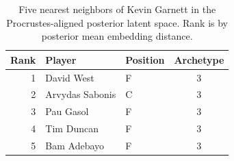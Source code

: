 \begin{table}[htbp]
  \centering\small
  \begin{tabular}{rllc}
    \toprule
    Rank & Player & Position & Archetype \\
    \midrule
    1 & David West & F & 3 \\
    2 & Arvydas Sabonis & C & 3 \\
    3 & Pau Gasol & F & 3 \\
    4 & Tim Duncan & F & 3 \\
    5 & Bam Adebayo & F & 3 \\
    \bottomrule
  \end{tabular}
  \caption{Five nearest neighbors of Kevin Garnett in the Procrustes-aligned posterior latent space. Rank is by posterior mean embedding distance.}
  \label{tab:Kevin_Garnett_neighbors}
\end{table}

